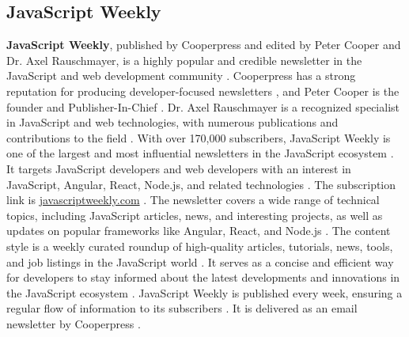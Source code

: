 \documentclass[11pt]{article}
\begin{document}
\subsection{JavaScript Weekly}
\textbf{JavaScript Weekly}, published by Cooperpress and edited by Peter Cooper and Dr. Axel Rauschmayer, is a highly popular and credible newsletter in the JavaScript and web development community \citep{runcloud2025worlds}. Cooperpress has a strong reputation for producing developer-focused newsletters \citep{cooperpress2025pubs}, and Peter Cooper is the founder and Publisher-In-Chief \citep{cooperpress2025team}. Dr. Axel Rauschmayer is a recognized specialist in JavaScript and web technologies, with numerous publications and contributions to the field \citep{amanexplains2025newsletters}. With over 170,000 subscribers, JavaScript Weekly is one of the largest and most influential newsletters in the JavaScript ecosystem \citep{ctoclub2025prognews}. It targets JavaScript developers and web developers with an interest in JavaScript, Angular, React, Node.js, and related technologies \citep{github2025devnewsletters}. The subscription link is \url{javascriptweekly.com} \citep{runcloud2025worlds}. The newsletter covers a wide range of technical topics, including JavaScript articles, news, and interesting projects, as well as updates on popular frameworks like Angular, React, and Node.js \citep{runcloud2025worlds}. The content style is a weekly curated roundup of high-quality articles, tutorials, news, tools, and job listings in the JavaScript world \citep{runcloud2025worlds}. It serves as a concise and efficient way for developers to stay informed about the latest developments and innovations in the JavaScript ecosystem \citep{sitepoint2025devnews}. JavaScript Weekly is published every week, ensuring a regular flow of information to its subscribers \citep{runcloud2025worlds}. It is delivered as an email newsletter by Cooperpress \citep{javascriptweekly2025}.
\end{document}
